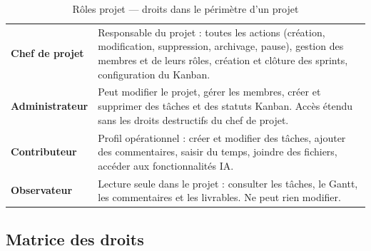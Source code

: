 \begin{table}[H]
  \centering
  \caption{Rôles projet — droits dans le périmètre d'un projet}
  \label{tab:roles_projet}
  \begin{tabularx}{\textwidth}{L{3.5cm}X}
    \toprule
     &  \\
    \midrule
    \textbf{Chef de projet} & Responsable du projet : toutes les actions (création,
      modification, suppression, archivage, pause), gestion des membres et de leurs
      rôles, création et clôture des sprints, configuration du Kanban. \\
    \textbf{Administrateur} & Peut modifier le projet, gérer les membres, créer et
      supprimer des tâches et des statuts Kanban. Accès étendu sans les droits
      destructifs du chef de projet. \\
    \textbf{Contributeur} & Profil opérationnel : créer et modifier des tâches,
      ajouter des commentaires, saisir du temps, joindre des fichiers, accéder
      aux fonctionnalités IA. \\
    \textbf{Observateur} & Lecture seule dans le projet : consulter les tâches,
      le Gantt, les commentaires et les livrables. Ne peut rien modifier. \\
    \bottomrule
  \end{tabularx}
\end{table}

\subsection{Matrice des droits}


